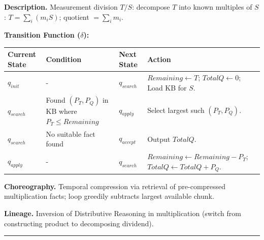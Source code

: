 \documentclass[12pt]{book}
\begin{document}
\textbf{Description.} Measurement division \(T / S\): decompose \(T\)
into known multiples of \(S\): \(T = \sum_i (m_i S)\); quotient
\(= \sum_i m_i\).

\textbf{Transition Function (\(\delta\)):}

\begin{longtable}[]{@{}
  >{\raggedright\arraybackslash}p{}
  >{\raggedright\arraybackslash}p{}
  >{\raggedright\arraybackslash}p{}
  >{\raggedright\arraybackslash}p{}@{}}
\toprule\noalign{}
\begin{minipage}[b]{\linewidth}\raggedright
Current State
\end{minipage} & \begin{minipage}[b]{\linewidth}\raggedright
Condition
\end{minipage} & \begin{minipage}[b]{\linewidth}\raggedright
Next State
\end{minipage} & \begin{minipage}[b]{\linewidth}\raggedright
Action
\end{minipage} \\
\midrule\noalign{}
\endhead
\bottomrule\noalign{}
\endlastfoot
\(q_{init}\) & - & \(q_{search}\) & \(Remaining \leftarrow T\);
\(TotalQ \leftarrow 0\); Load KB for \(S\). \\
\(q_{search}\) & Found \((P_T, P_Q)\) in KB where \(P_T \le Remaining\)
& \(q_{apply}\) & Select largest such \((P_T, P_Q)\). \\
\(q_{search}\) & No suitable fact found & \(q_{accept}\) & Output
\(TotalQ\). \\
\(q_{apply}\) & - & \(q_{search}\) &
\(Remaining \leftarrow Remaining - P_T\);
\(TotalQ \leftarrow TotalQ + P_Q\). \\
\end{longtable}

\textbf{Choreography.} Temporal compression via retrieval of
pre-compressed multiplication facts; loop greedily subtracts largest
available chunk.

\textbf{Lineage.} Inversion of Distributive Reasoning in multiplication
(switch from constructing product to decomposing dividend).

\begin{center}\rule{0.5\linewidth}{0.5pt}\end{center}
\end{document}
